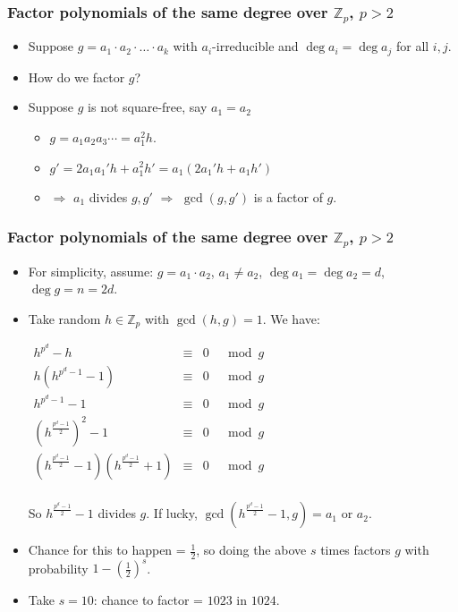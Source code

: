 \begin{frame}
\frametitle{Factor polynomials of the same degree over $\mathbb Z_p$, $p>2$}
\begin{itemize}
\item Suppose $ g=a_1\cdot a_2\cdot \dots \cdot a_k$ with $a_i$-irreducible and $\deg a_i=\deg a_j$ for all $i,j$.
\item How do we factor $g$?
\item Suppose $g$ is not square-free, say $a_1=a_2$
\begin{itemize}
\item $g= a_1a_2 a_3\cdots= a_1^2  h$.
\item $g'= 2a_1 a_1' h+ a_1^2 h'=a_1(2a_1'h+a_1h')$ 
\item $\Rightarrow$ $a_1$ divides $g, g' $ $\Rightarrow$ $\gcd(g,g')$ is a factor of $g$.
\end{itemize} 
\end{itemize}
\end{frame}

\begin{frame}
\frametitle{Factor polynomials of the same degree over $\mathbb Z_p$, $p>2$}
\begin{itemize}
\item For simplicity, assume: $g=a_1\cdot a_2$, $a_1\neq a_2$, $\deg a_1=\deg a_2=d$, $\deg g=n=2d$. 
\item  Take random $h\in \mathbb Z_p$ with $\gcd(h,g)=1$. We have:

\hfil \hfil $
\begin{array}{rcll}
h^{p^d}-h &\equiv &0&\mod g\\
h\left(h^{p^d-1}-1 \right)& \equiv &0&\mod g \\
h^{p^d-1}-1&\equiv&0&\mod g\\
\left( h^{\frac{p^d-1}{2}}\right)^2 - 1&\equiv&0& \mod g\\
\left( h^{\frac{p^d-1}{2}} - 1\right)\left( h^{\frac{p^d-1}{2}}+ 1\right) &\equiv&0& \mod g\\
\end{array}
$

So $h^{\frac{p^d-1}{2}} - 1$ divides $g$. If lucky, $\gcd\left(h^{\frac{p^d-1}{2}} - 1,g\right)=a_1$ or $a_2$.

\item Chance for this to happen = $\frac{1}{2}$, so doing the above $s$ times factors $g$ with probability $1-\left(\frac{1}{2} \right)^s$. 
\item Take $s=10$: chance to factor = $1023$ in $1024$.
\end{itemize}
\end{frame}